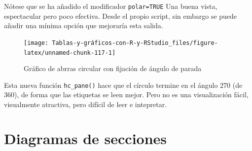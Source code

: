 \documentclass[
]{book}
\newenvironment{Shaded}{\begin{snugshade}}{\end{snugshade}}
\newcommand{\AttributeTok}[1]{\textcolor[rgb]{0.77,0.63,0.00}{#1}}
\newcommand{\ConstantTok}[1]{\textcolor[rgb]{0.00,0.00,0.00}{#1}}
\newcommand{\DecValTok}[1]{\textcolor[rgb]{0.00,0.00,0.81}{#1}}
\newcommand{\FunctionTok}[1]{\textcolor[rgb]{0.00,0.00,0.00}{#1}}
\newcommand{\NormalTok}[1]{#1}
\newcommand{\SpecialCharTok}[1]{\textcolor[rgb]{0.00,0.00,0.00}{#1}}
\newcommand{\StringTok}[1]{\textcolor[rgb]{0.31,0.60,0.02}{#1}}
\begin{document}
Nótese que se ha añadido el modificador \texttt{polar=TRUE} Una buena vista, espectacular pero poco efectiva. Desde el propio script, sin embargo se puede añadir una mínima opción que mejoraría esta salida.

\begin{Shaded}
\end{Shaded}

\begin{figure}[H]

{\centering \texttt{[image: Tablas-y-gráficos-con-R-y-RStudio\_files/figure-latex/unnamed-chunk-117-1]} 

}

\caption{Gráfico de abrras circular con fijación de ángulo de parada}\label{fig:unnamed-chunk-117}
\end{figure}

Esta nueva función \texttt{hc\_pane()} hace que el círculo termine en el ángulo 270 (de 360), de forma que las etiquetas se leen mejor. Pero no es una visualización fácil, visualmente atractiva, pero difícil de leer e intepretar.

\hypertarget{diagramas-de-secciones}{%
\section{Diagramas de secciones}\label{diagramas-de-secciones}}
\end{document}
